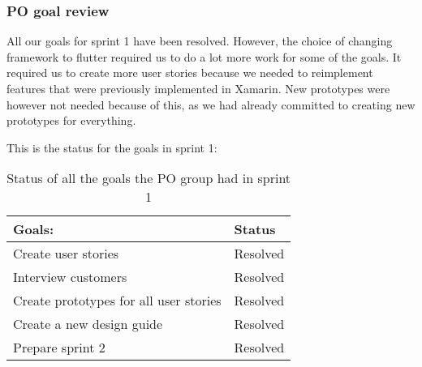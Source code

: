 \subsubsection{PO goal review}
All our goals for sprint 1 have been resolved. 
However, the choice of changing framework to flutter required us to do a lot more work for some of the goals.
It required us to create more user stories because we needed to reimplement features that were previously implemented in Xamarin.
New prototypes were however not needed because of this, as we had already committed to creating new prototypes for everything.

\noindent
This is the status for the goals in sprint 1:
\begin{table}[H]
    \centering
    \begin{tabular}{|l|l|}
    \hline
    Goals:                                 & Status   \\ \hline
    Create user stories                    & Resolved \\ \hline
    Interview customers                    & Resolved \\ \hline
    Create prototypes for all user stories & Resolved \\ \hline
    Create a new design guide                & Resolved \\ \hline
    Prepare sprint 2                       & Resolved \\ \hline
    \end{tabular}
    \caption{Status of all the goals the PO group had in sprint 1}
    \label{PO-goal-review-sprint-1}
\end{table}

